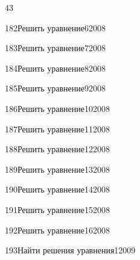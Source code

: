 \begin{TrigSourcePage}{43}
\begin{TrigExercise}{182}{Решить уравнение}{6}{2008}
\end{TrigExercise}
\begin{TrigExercise}{183}{Решить уравнение}{7}{2008}
\end{TrigExercise}
\begin{TrigExercise}{184}{Решить уравнение}{8}{2008}
\end{TrigExercise}
\begin{TrigExercise}{185}{Решить уравнение}{9}{2008}
\end{TrigExercise}
\begin{TrigExercise}{186}{Решить уравнение}{10}{2008}
\end{TrigExercise}
\begin{TrigExercise}{187}{Решить уравнение}{11}{2008}
\end{TrigExercise}
\begin{TrigExercise}{188}{Решить уравнение}{12}{2008}
\end{TrigExercise}
\begin{TrigExercise}{189}{Решить уравнение}{13}{2008}
\end{TrigExercise}
\begin{TrigExercise}{190}{Решить уравнение}{14}{2008}
\end{TrigExercise}
\begin{TrigExercise}{191}{Решить уравнение}{15}{2008}
\end{TrigExercise}
\begin{TrigExercise}{192}{Решить уравнение}{16}{2008}
\end{TrigExercise}
\begin{TrigExercise}{193}{Найти решения уравнения}{1}{2009}

\end{TrigExercise}
\end{TrigSourcePage}
